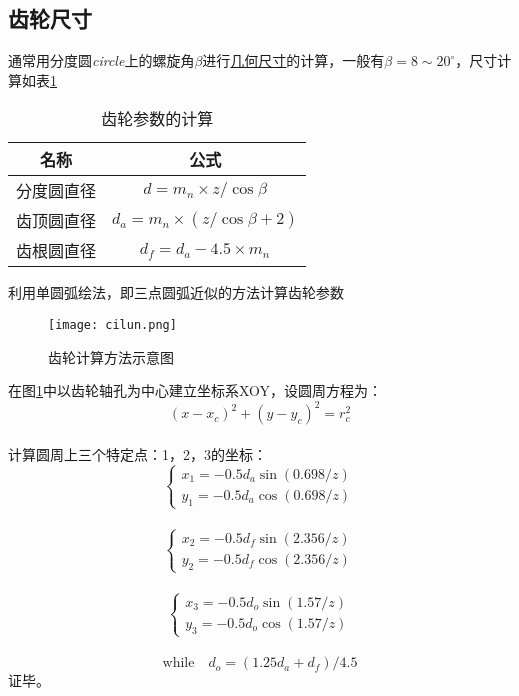 \documentclass[UTF8,12px,a4paper]{ctexart} %
\numberwithin{equation}{section} %
\begin{document}
\subsection{\heiti 齿轮尺寸}
通常用分度圆\emph{circle}上的螺旋角$\beta$进行\underline{几何尺寸}的计算\cite{wang}，一般有$\beta=8 \sim 20^{\circ}$，尺寸计算如表\ref{tab1}\\
\begin{table}[!hbp]
\centering
\begin{tabular}{c|c}
	\hline
	名称 & 公式\\
	\hline
	分度圆直径 & $d=m_n\times z/\cos \beta$\\
	齿顶圆直径 & $d_a=m_n\times (z/\cos \beta+2)$\\
	齿根圆直径 & $d_f=d_a-4.5\times m_n$\\
	\hline
\end{tabular}
\caption{齿轮参数的计算}
\label{tab1}
\end{table}
利用单圆弧绘法，即三点圆弧近似的方法计算齿轮参数\\
\begin{figure}[htb]
	\texttt{[image: cilun.png]}
	\caption{齿轮计算方法示意图}
	\label{fig1}
\end{figure}
在图\ref{fig1}中以齿轮轴孔为中心建立坐标系XOY，设圆周方程为：\\
\begin{equation}
	(x-x_c)^2+(y-y_c)^2=r_c^2
\end{equation}\\
计算圆周上三个特定点：1，2，3的坐标：\\
\begin{equation}
	\begin{cases}
	x_1=-0.5d_a\sin(0.698/z)\\
	y_1=-0.5d_a\cos(0.698/z)
	\end{cases}
\end{equation}\\
\begin{equation}
	\begin{cases}
	x_2=-0.5d_f\sin(2.356/z)\\
	y_2=-0.5d_f\cos(2.356/z)
	\end{cases}
\end{equation}\\
\begin{equation}
	\begin{cases}
	x_3=-0.5d_o\sin(1.57/z)\\
	y_3=-0.5d_o\cos(1.57/z)
	\end{cases}
\end{equation}\\
$$
	\text{while} \quad d_o=(1.25d_a+d_f)/4.5
$$
证毕。
\end{document}
